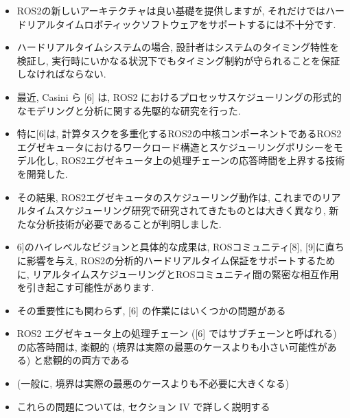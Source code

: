 \begin{frame}{}
    \begin{itemize}
        \item ROS2の新しいアーキテクチャは良い基礎を提供しますが, それだけではハードリアルタイムロボティックソフトウェアをサポートするには不十分です.
        \item ハードリアルタイムシステムの場合, 設計者はシステムのタイミング特性を検証し, 実行時にいかなる状況下でもタイミング制約が守られることを保証しなければならない.
        \item 最近, Casini ら [6] は, ROS2 におけるプロセッサスケジューリングの形式的なモデリングと分析に関する先駆的な研究を行った.
        \item 特に[6]は, 計算タスクを多重化するROS2の中核コンポーネントであるROS2エグゼキュータにおけるワークロード構造とスケジューリングポリシーをモデル化し, ROS2エグゼキュータ上の処理チェーンの応答時間を上界する技術を開発した.
    \end{itemize}
\end{frame}

\begin{frame}{}
    \begin{itemize}
        \item その結果, ROS2エグゼキュータのスケジューリング動作は, これまでのリアルタイムスケジューリング研究で研究されてきたものとは大きく異なり, 新たな分析技術が必要であることが判明しました.
        \item 6]のハイレベルなビジョンと具体的な成果は, ROSコミュニティ[8], [9]に直ちに影響を与え, ROS2の分析的ハードリアルタイム保証をサポートするために, リアルタイムスケジューリングとROSコミュニティ間の緊密な相互作用を引き起こす可能性があります.
    \end{itemize}
\end{frame}


\begin{frame}{}
    \begin{itemize}
        \item その重要性にも関わらず, [6] の作業にはいくつかの問題がある
        \item ROS2 エグゼキュータ上の処理チェーン ([6] ではサブチェーンと呼ばれる) の応答時間は, 楽観的 (境界は実際の最悪のケースよりも小さい可能性がある) と悲観的の両方である
        \item (一般に, 境界は実際の最悪のケースよりも不必要に大きくなる)
        \item これらの問題については, セクション IV で詳しく説明する
    \end{itemize}
\end{frame}

